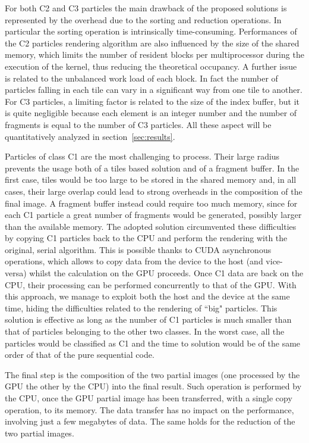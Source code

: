 \documentclass[11pt]{article}
\begin{document}
For both C2 and C3 particles the main drawback of the proposed solutions 
is represented by the overhead due to the sorting and reduction operations. In particular the sorting operation is intrinsically time-consuming.
Performances of the C2 particles rendering algorithm are also influenced 
by the size of the shared memory, which limits the number of resident blocks
per multiprocessor during the execution of the kernel, thus reducing the theoretical
occupancy. A further issue is related to the
unbalanced work load of each block. In fact the number of particles falling
in each tile can vary in a significant way from one tile to another. 
For C3 particles, a limiting factor is related to the size of the index buffer, but it is quite negligible because each element is an integer number and the number of fragments is equal to the number of C3 particles.
All these aspect will be quantitatively analyzed in section~\ref{sec:results}.

Particles of class C1 are the most challenging to process. Their large 
radius prevents the usage both of a tiles based solution and of a fragment buffer.
In the first case, tiles would be too large to be stored in the shared memory
and, in all cases, their large overlap could lead to strong overheads in the composition of the 
final image. A fragment buffer instead could require too much memory, since 
for each C1 particle a great number of fragments would be generated, possibly
larger than the available memory. The adopted solution circumvented these 
difficulties by copying C1 particles back to the CPU and perform the rendering 
with the original, serial algorithm. This is possible thanks to CUDA asynchronous
operations, which allows to copy data from the device to the host (and vice-versa)
whilst the calculation on the GPU proceeds. Once C1 data are back on the CPU, 
their processing can be performed concurrently to that of the GPU.  
With this approach, we manage to exploit both the host and the device
at the same time, hiding the difficulties related to the rendering of ``big"
particles. This solution is effective as long as the number of C1 particles 
is much smaller than that of particles belonging to the other two classes. 
In the worst case, all the particles would be classified as C1 and the time to solution 
would be of the same order of that of the pure sequential code. 

The final step is the composition of the two partial images (one processed by the
GPU the other by the CPU) into the final result. 
Such operation is performed by the CPU, 
once the GPU partial image has been transferred, with a single copy operation, to
its memory. The data transfer has no impact on the performance, involving just a few 
megabytes of data. The same holds for the reduction of the two partial images.   
\end{document}
